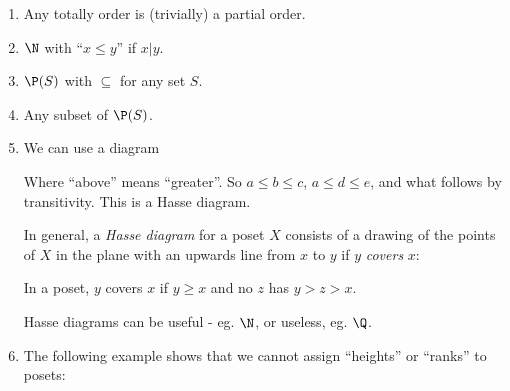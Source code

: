 \documentclass[a4paper]{article}
\begin{document}
\begin{eg}\leavevmode
  \begin{enumerate}
    \item Any totally order is (trivially) a partial order.
    \item $\N$ with ``$x\leq y$'' if $x | y$.
    \item $\P(S)$ with $\subseteq$ for any set $S$.
    \item Any subset of $\P(S)$.
    \item We can use a diagram
      \begin{center}
      \end{center}
      Where ``above'' means ``greater''. So $a \leq b\leq c$, $a \leq d\leq e$, and what follows by transitivity. This is a Hasse diagram.

      \begin{defi}
        In general, a \emph{Hasse diagram} for a poset $X$ consists of a drawing of the points of $X$ in the plane with an upwards line from $x$ to $y$ if $y$ \emph{covers} $x$:
      \end{defi}
      \begin{defi}[Cover]
        In a poset, $y$ covers $x$ if $y \geq x$ and no $z$ has $y > z > x$.
      \end{defi}
      Hasse diagrams can be useful - eg. $\N$, or useless, eg. $\Q$.
    \item The following example shows that we cannot assign ``heights'' or ``ranks'' to posets:
      \begin{center}
\end{center}
\end{enumerate}
\end{eg}
\end{document}
